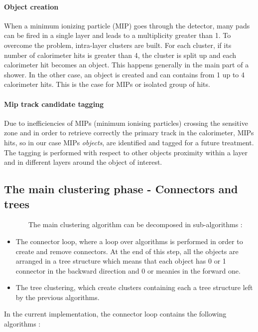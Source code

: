 \documentclass[cits]{JINST}
\begin{document}
\paragraph*{Object creation} When a minimum ionizing particle (MIP) goes through the detector, many pads can be fired in a single layer and leads to a multiplicity greater than 1. To overcome the problem, intra-layer clusters are built. For each cluster, if its number of calorimeter hits is greater than 4, the cluster is split up and each calorimeter hit becomes an object. This happens generally in the main part of a shower. In the other case, an object is created and can contains from 1 up to 4 calorimeter hits. This is the case for MIPs or isolated group of hits. 

\paragraph*{Mip track candidate tagging}
Due to inefficiencies of MIPs (minimum ionising particles) crossing the sensitive zone and in order to retrieve correctly the primary track in the calorimeter, MIPs hits, so in our case MIPs \textit{objects}, are identified and tagged for a future treatment. The tagging is performed with respect to other objects proximity within a layer and in different layers around the object of interest.

\subsection{The main clustering phase - Connectors and trees}

~~~~~~~The main clustering algorithm can be decomposed in sub-algorithms :
\begin{itemize}
  \item The connector loop, where a loop over algorithms is performed in order to create and remove connectors. At the end of this step, all the objects are arranged in a tree structure which means that each object has 0 or 1 connector in the backward direction and 0 or meanies in the forward one.
  \item The tree clustering, which create clusters containing each a tree structure left by the previous algorithms.
\end{itemize}

In the current implementation, the connector loop contains the following algorithms :
\end{document}

